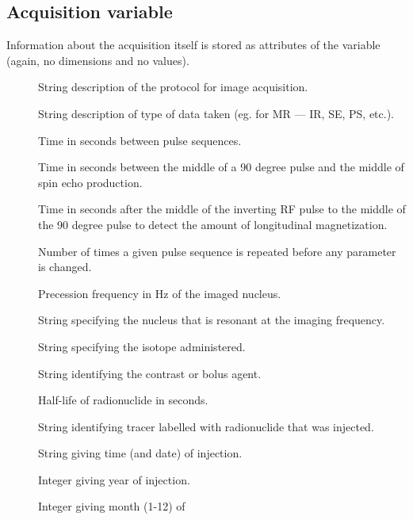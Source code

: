 \documentclass{article}
\begin{document}
\subsection{Acquisition variable}

Information about the acquisition itself is stored as attributes of
the  variable (again, no dimensions and no values).

\begin{description}
   \item [] String description of the protocol for
      image acquisition.
   \item [] String description of type of data
      taken (eg. for MR --- IR, SE, PS, etc.).
   \item [] Time in seconds between pulse
      sequences.
   \item [] Time in seconds between the middle of a 90
      degree pulse and the middle of spin echo production.
   \item [] Time in seconds after the middle of
      the inverting RF pulse to the middle of the 90 degree pulse to
      detect the amount of longitudinal magnetization.
   \item [] Number of times a given pulse sequence
      is repeated before any parameter is changed.
   \item [] Precession frequency in Hz of the
      imaged nucleus.
   \item [] String specifying the nucleus that is
      resonant at the imaging frequency.
   \item [] String specifying the isotope administered.
   \item [] String identifying the contrast or
      bolus agent.
   \item [] Half-life of radionuclide in
      seconds. 
   \item [] String identifying tracer labelled with
      radionuclide that was injected.
   \item [] String giving time (and date) of
      injection.
   \item []  Integer giving year of injection.
   \item [] Integer giving month (1-12) of

\end{description}
\end{document}
